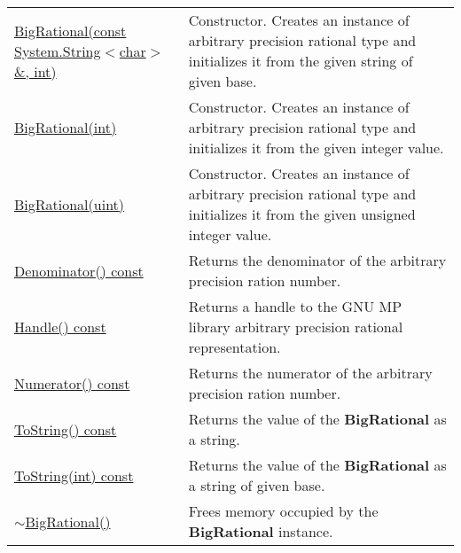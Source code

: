 \documentclass[a4paper,oneside,11.000000pt]{book}
\begin{document}
\begin{flushleft}
\begin{supertabular}[l]{!{\raggedright}p{7.575cm}!{\raggedright}p{7.575cm}}
\\
\hyperlink{System.Numerics.Multiprecision.BigRational.constructor.P.System.Numerics.Multiprecision.BigRational.C.R.System.String.char.int}{BigRational(const System.\-String$<$\-char$>$\-\&\-, int)}
& Constructor. Creates an instance of arbitrary precision rational type and initializes it from the given string of given base.

\\
\hyperlink{System.Numerics.Multiprecision.BigRational.constructor.P.System.Numerics.Multiprecision.BigRational.int}{BigRational(int)}
& Constructor. Creates an instance of arbitrary precision rational type and initializes it from the given integer value.

\\
\hyperlink{System.Numerics.Multiprecision.BigRational.constructor.P.System.Numerics.Multiprecision.BigRational.uint}{BigRational(uint)}
& Constructor. Creates an instance of arbitrary precision rational type and initializes it from the given unsigned integer value.

\\
\hyperlink{System.Numerics.Multiprecision.BigRational.Denominator.C.P.System.Numerics.Multiprecision.BigRational}{Denominator() const}
& Returns the denominator of the arbitrary precision ration number.

\\
\hyperlink{System.Numerics.Multiprecision.BigRational.Handle.C.P.System.Numerics.Multiprecision.BigRational}{Handle() const}
& Returns a handle to the GNU MP library arbitrary precision rational representation.

\\
\hyperlink{System.Numerics.Multiprecision.BigRational.Numerator.C.P.System.Numerics.Multiprecision.BigRational}{Numerator() const}
& Returns the numerator of the arbitrary precision ration number.

\\
\hyperlink{System.Numerics.Multiprecision.BigRational.ToString.C.P.System.Numerics.Multiprecision.BigRational}{ToString() const}
& Returns the value of the \textbf{BigRational}
 as a string.

\\
\hyperlink{System.Numerics.Multiprecision.BigRational.ToString.C.P.System.Numerics.Multiprecision.BigRational.int}{ToString(int) const}
& Returns the value of the \textbf{BigRational}
 as a string of given base.

\\
\hyperlink{System.Numerics.Multiprecision.BigRational.destructor.P.System.Numerics.Multiprecision.BigRational}{$\sim$BigRational()}
& Frees memory occupied by the \textbf{BigRational}
 instance.

\\
\end{supertabular}

\end{flushleft}
\clearpage
\end{document}
